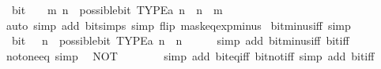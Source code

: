\begin{isabellebody}
\ \ {\isacartoucheopen}bit\ {\isacharparenleft}{\kern0pt}{\isacharminus}{\kern0pt}\ {\isacharparenleft}{\kern0pt}{}\ {\isacharcircum}{\kern0pt}\ m{\isacharparenright}{\kern0pt}{\isacharparenright}{\kern0pt}\ n\ {\isasymlongleftrightarrow}\ possible{\isacharunderscore}{\kern0pt}bit\ TYPE{\isacharparenleft}{\kern0pt}{\isacharprime}{\kern0pt}a{\isacharparenright}{\kern0pt}\ n\ {\isasymand}\ n\ {\isasymge}\ m{\isacartoucheclose}\isanewline
%
\isadelimproof
\ \ %
\endisadelimproof
%
\isatagproof
{}\isamarkupfalse%
\ {\isacharparenleft}{\kern0pt}auto\ simp\ add{\isacharcolon}{\kern0pt}\ bit{\isacharunderscore}{\kern0pt}simps\ simp\ flip{\isacharcolon}{\kern0pt}\ mask{\isacharunderscore}{\kern0pt}eq{\isacharunderscore}{\kern0pt}exp{\isacharunderscore}{\kern0pt}minus{\isacharunderscore}{\kern0pt}{}{\isacharparenright}{\kern0pt}%
\endisatagproof
{\isafoldproof}%
%
\isadelimproof
\isanewline
%
\endisadelimproof
\isanewline
{}\isamarkupfalse%
\ bit{\isacharunderscore}{\kern0pt}minus{\isacharunderscore}{\kern0pt}{}{\isacharunderscore}{\kern0pt}iff\ {\isacharbrackleft}{\kern0pt}simp{\isacharbrackright}{\kern0pt}{\isacharcolon}{\kern0pt}\isanewline
\ \ {\isacartoucheopen}bit\ {\isacharparenleft}{\kern0pt}{\isacharminus}{\kern0pt}\ {}{\isacharparenright}{\kern0pt}\ n\ {\isasymlongleftrightarrow}\ possible{\isacharunderscore}{\kern0pt}bit\ TYPE{\isacharparenleft}{\kern0pt}{\isacharprime}{\kern0pt}a{\isacharparenright}{\kern0pt}\ n\ {\isasymand}\ n\ {\isachargreater}{\kern0pt}\ {}{\isacartoucheclose}\isanewline
%
\isadelimproof
\ \ %
\endisadelimproof
%
\isatagproof
{}\isamarkupfalse%
\ {\isacharparenleft}{\kern0pt}simp\ add{\isacharcolon}{\kern0pt}\ bit{\isacharunderscore}{\kern0pt}minus{\isacharunderscore}{\kern0pt}iff\ bit{\isacharunderscore}{\kern0pt}{}{\isacharunderscore}{\kern0pt}iff{\isacharparenright}{\kern0pt}%
\endisatagproof
{\isafoldproof}%
%
\isadelimproof
\isanewline
%
\endisadelimproof
\isanewline
{}\isamarkupfalse%
\ not{\isacharunderscore}{\kern0pt}one{\isacharunderscore}{\kern0pt}eq\ {\isacharbrackleft}{\kern0pt}simp{\isacharbrackright}{\kern0pt}{\isacharcolon}{\kern0pt}\isanewline
\ \ {\isacartoucheopen}NOT\ {}\ {\isacharequal}{\kern0pt}\ {\isacharminus}{\kern0pt}\ {}{\isacartoucheclose}\isanewline
%
\isadelimproof
\ \ %
\endisadelimproof
%
\isatagproof
{}\isamarkupfalse%
\ {\isacharparenleft}{\kern0pt}simp\ add{\isacharcolon}{\kern0pt}\ bit{\isacharunderscore}{\kern0pt}eq{\isacharunderscore}{\kern0pt}iff\ bit{\isacharunderscore}{\kern0pt}not{\isacharunderscore}{\kern0pt}iff{\isacharparenright}{\kern0pt}\ {\isacharparenleft}{\kern0pt}simp\ add{\isacharcolon}{\kern0pt}\ bit{\isacharunderscore}{\kern0pt}{}{\isacharunderscore}{\kern0pt}iff{\isacharparenright}{\kern0pt}%

\end{isabellebody}
